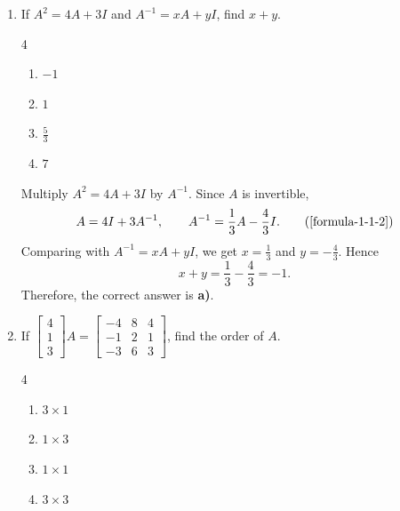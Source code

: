 \begin{enumerate}[label={},font=\normalfont,leftmargin=1.15cm,labelwidth=1.0cm,labelsep=0.15cm,itemindent=0pt,listparindent=0pt,itemsep=\baselineskip,parsep=0pt,topsep=0pt]
\item[3.1.2] If $A^2=4A+3I$ and $A^{-1}=xA+yI$, find $x+y$.

\begin{multicols}{4}
\begin{enumerate}
\setlength{\itemsep}{0pt}
    \item $-1$
    \item $1$
    \item $\frac53$
    \item $7$
\end{enumerate}
\end{multicols}

\vspace{0.6em}\par\solution


Multiply $A^2=4A+3I$ by $A^{-1}$. Since $A$ is invertible,
\begin{equation*}
A=4I+3A^{-1},\qquad A^{-1}=\frac13A-\frac43I.
\tag*{(\ref{formula-1-1-2})}\end{equation*}
Comparing with $A^{-1}=xA+yI$, we get $x=\frac13$ and $y=-\frac43$. Hence
\[
x+y=\frac13-\frac43=-1.
\]
Therefore, the correct answer is \textbf{a)}.
\item[3.1.4] If $\begin{bmatrix}4\\1\\3\end{bmatrix}A=\begin{bmatrix}-4&8&4\\-1&2&1\\-3&6&3\end{bmatrix}$, find the order of $A$.

\begin{multicols}{4}
\begin{enumerate}
\setlength{\itemsep}{0pt}
    \item $3\times1$
    \item $1\times3$
    \item $1\times1$
    \item $3\times3$
\end{enumerate}
\end{multicols}

\vspace{0.6em}\par\solution



\end{enumerate}
